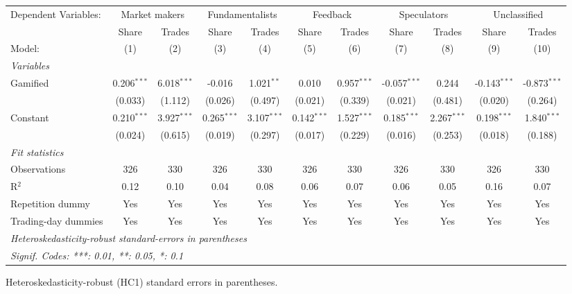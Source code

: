 \begingroup
\centering
\begin{tabular}{lcccccccccc}
   \tabularnewline \midrule \midrule
   Dependent Variables: & \multicolumn{2}{c}{Market makers} & \multicolumn{2}{c}{Fundamentalists} & \multicolumn{2}{c}{Feedback} & \multicolumn{2}{c}{Speculators} & \multicolumn{2}{c}{Unclassified}\\
                       & Share         & Trades        & Share         & Trades        & Share         & Trades        & Share          & Trades        & Share          & Trades \\   
   Model:              & (1)           & (2)           & (3)           & (4)           & (5)           & (6)           & (7)            & (8)           & (9)            & (10)\\  
   \midrule
   \emph{Variables}\\
   Gamified            & 0.206$^{***}$ & 6.018$^{***}$ & -0.016        & 1.021$^{**}$  & 0.010         & 0.957$^{***}$ & -0.057$^{***}$ & 0.244         & -0.143$^{***}$ & -0.873$^{***}$\\   
                       & (0.033)       & (1.112)       & (0.026)       & (0.497)       & (0.021)       & (0.339)       & (0.021)        & (0.481)       & (0.020)        & (0.264)\\   
   Constant            & 0.210$^{***}$ & 3.927$^{***}$ & 0.265$^{***}$ & 3.107$^{***}$ & 0.142$^{***}$ & 1.527$^{***}$ & 0.185$^{***}$  & 2.267$^{***}$ & 0.198$^{***}$  & 1.840$^{***}$\\   
                       & (0.024)       & (0.615)       & (0.019)       & (0.297)       & (0.017)       & (0.229)       & (0.016)        & (0.253)       & (0.018)        & (0.188)\\   
   \midrule
   \emph{Fit statistics}\\
   Observations        & 326           & 330           & 326           & 330           & 326           & 330           & 326            & 330           & 326            & 330\\  
   R$^2$               & 0.12          & 0.10          & 0.04          & 0.08          & 0.06          & 0.07          & 0.06           & 0.05          & 0.16           & 0.07\\  
   Repetition dummy    & Yes           & Yes           & Yes           & Yes           & Yes           & Yes           & Yes            & Yes           & Yes            & Yes\\  
   Trading-day dummies & Yes           & Yes           & Yes           & Yes           & Yes           & Yes           & Yes            & Yes           & Yes            & Yes\\  
   \midrule \midrule
   \multicolumn{11}{l}{\emph{Heteroskedasticity-robust standard-errors in parentheses}}\\
   \multicolumn{11}{l}{\emph{Signif. Codes: ***: 0.01, **: 0.05, *: 0.1}}\\
\end{tabular}
 
\par \raggedright 
Heteroskedasticity-robust (HC1) standard errors in parentheses.
\par\endgroup
